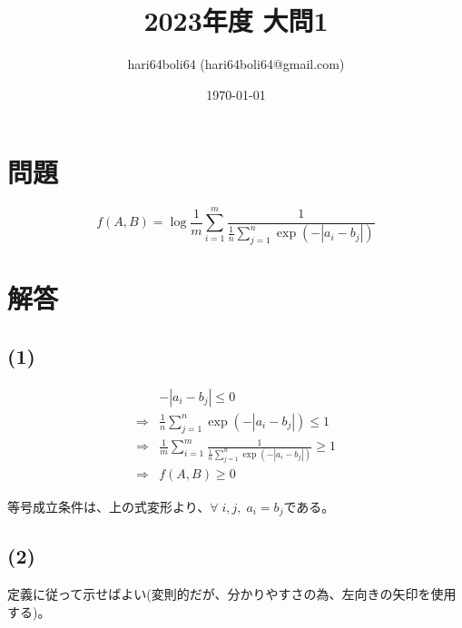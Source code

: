 \documentclass[a4paper, 10pt, dvipdfmx]{jlreq}
\begin{document}
\title{2023年度 大問1}
\author{hari64boli64 (hari64boli64@gmail.com)}
\date{\today}
\maketitle

\section{問題}

\begin{equation*}
  f(A,B)=\log{
  \frac{1}{m}\sum_{i=1}^{m}{
  \frac{1}{\frac{1}{n}\sum_{j=1}^{n}{\exp(-|a_i-b_j|)}}}
  }
\end{equation*}

\section{解答}

\subsection*{(1)}

\begin{align*}
              & -|a_i-b_j| \leq 0                                                                       \\
  \Rightarrow & \frac{1}{n}\sum_{j=1}^{n}{\exp(-|a_i-b_j|)} \leq 1                                      \\
  \Rightarrow & \frac{1}{m}\sum_{i=1}^{m}{\frac{1}{\frac{1}{n}\sum_{j=1}^{n}{\exp(-|a_i-b_j|)}}} \geq 1 \\
  \Rightarrow & f(A,B) \geq 0
\end{align*}

等号成立条件は、上の式変形より、$\forall \; i,j, \; a_i=b_j$である。

\subsection*{(2)}

定義に従って示せばよい(変則的だが、分かりやすさの為、左向きの矢印を使用する)。
\end{document}
